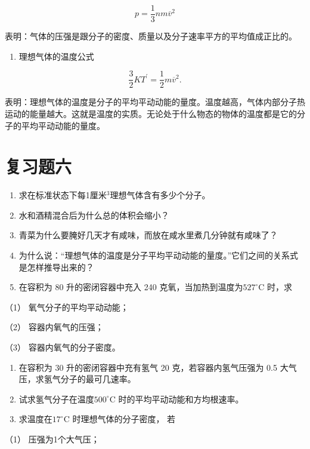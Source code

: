 \[
p = \frac {1}{3} n m \overline {{v}} ^ {2}
\]

表明：气体的压强是跟分子的密度、质量以及分子速率平方的平均值成正比的。

\begin{enumerate}
\def\labelenumi{\arabic{enumi}.}
\setcounter{enumi}{4}
\tightlist
\item
  理想气体的温度公式
\end{enumerate}

\[
\frac {3}{2} K T ^ {\prime} = \frac {1}{2} m \overline {{v}} ^ {2}.
\]

表明：理想气体的温度是分子的平均平动动能的量度。温度越高，气体内部分子热运动的能量越大。这就是温度的实质。无论处于什么物态的物体的温度都是它的分子的平均平动动能的量度。

\section{复习题六}\label{ux590dux4e60ux9898ux516d}

\begin{enumerate}
\def\labelenumi{\arabic{enumi}.}
\item
  求在标准状态下每1厘米\(^{3}\)理想气体含有多少个分子。
\item
  水和酒精混合后为什么总的体积会缩小？
\item
  青菜为什么要腌好几天才有咸味，而放在咸水里煮几分钟就有咸味了？
\item
  为什么说：``理想气体的温度是分子平均平动动能的量度。''它们之间的关系式是怎样推导出来的？
\item
  在容积为 80 升的密闭容器中充入 240
  克氧，当加热到温度为\(527^{\circ}\)C 时，求
\end{enumerate}

（1） 氧气分子的平均平动动能；

（2） 容器内氧气的压强；

（3） 容器内氧气的分子密度。

\begin{enumerate}
\def\labelenumi{\arabic{enumi}.}
\setcounter{enumi}{5}
\item
  在容积为 30 升的密闭容器中充有氢气 20 克，若容器内氢气压强为 0.5
  大气压，求氢气分子的最可几速率。
\item
  试求氢气分子在温度\(500^{\circ}\)C 时的平均平动动能和方均根速率。
\item
  求温度在\(17^{\circ}\)C 时理想气体的分子密度， 若
\end{enumerate}

（1） 压强为1个大气压；

